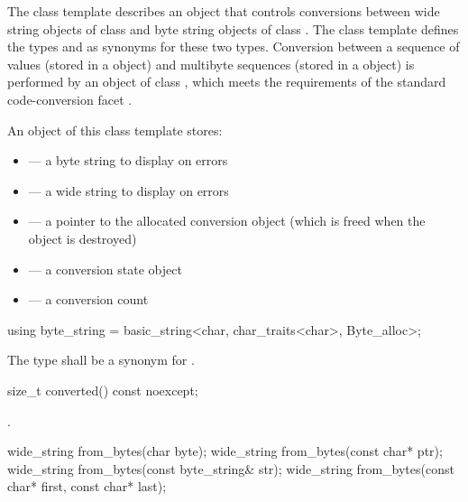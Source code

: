 \pnum
The class template describes an object that controls conversions between wide
string objects of class  and byte string objects of class . The class template defines the types
 and  as synonyms for these two types.
Conversion between a sequence of  values (stored in a
 object) and multibyte sequences (stored in a
 object) is performed by an object of class
, which meets the
requirements of the standard code-conversion facet .

\pnum
An object of this class template stores:

\begin{itemize}
\item {} --- a byte string to display on errors
\item {} --- a wide string to display on errors
\item {} --- a pointer to the allocated conversion object
(which is freed when the  object is destroyed)
\item {} --- a conversion state object
\item {} --- a conversion count
\end{itemize}

%
\begin{itemdecl}
using byte_string = basic_string<char, char_traits<char>, Byte_alloc>;
\end{itemdecl}

\begin{itemdescr}
\pnum
The type shall be a synonym for .
\end{itemdescr}

%
\begin{itemdecl}
size_t converted() const noexcept;
\end{itemdecl}

\begin{itemdescr}
\pnum
\returns {}.
\end{itemdescr}

%
\begin{itemdecl}
wide_string from_bytes(char byte);
wide_string from_bytes(const char* ptr);
wide_string from_bytes(const byte_string& str);
wide_string from_bytes(const char* first, const char* last);
\end{itemdecl}

